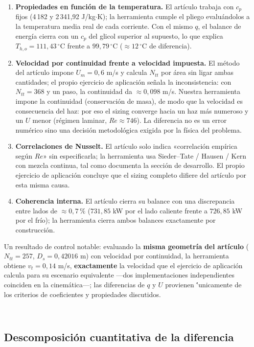 \documentclass[11pt,a4paper]{article}
\begin{document}
\begin{enumerate}
\item \textbf{Propiedades en funci\'on de la temperatura.} El art\'iculo
trabaja con $c_p$ fijos (4\,182 y 2\,341,92 J/kg$\cdot$K); la herramienta
cumple el pliego evalu\'andolos a la temperatura media real de cada corriente.
Con el mismo $q$, el balance de energ\'ia cierra con un $c_p$ del glicol
superior al supuesto, lo que explica $T_{h,o} = 111{,}43\,^\circ$C frente a
$99{,}79\,^\circ$C ($\approx 12\,^\circ$C de diferencia).
\item \textbf{Velocidad por continuidad frente a velocidad impuesta.} El
m\'etodo del art\'iculo impone $U_m = 0{,}6$ m/s y calcula $N_{tt}$ por
\'area sin ligar ambas cantidades; el propio ejercicio de aplicaci\'on se\~nala
la inconsistencia: con $N_{tt} = 368$ y un paso, la continuidad da
$\approx 0{,}098$ m/s. Nuestra herramienta impone la continuidad
(conservaci\'on de masa), de modo que la velocidad es consecuencia del haz:
por eso el sizing converge hacia un haz m\'as numeroso y un $U$ menor
(r\'egimen laminar, $Re \approx 746$). La diferencia no es un error num\'erico
sino una decisi\'on metodol\'ogica exigida por la f\'isica del problema.
\item \textbf{Correlaciones de Nusselt.} El art\'iculo solo indica
«correlaci\'on emp\'irica seg\'un $Re$» sin especificarla; la herramienta usa
Sieder--Tate / Hausen / Kern con mezcla continua, tal como documenta la
secci\'on de desarrollo. El propio ejercicio de aplicaci\'on concluye que el
sizing completo difiere del art\'iculo por esta misma causa.
\item \textbf{Coherencia interna.} El art\'iculo cierra su balance con una
discrepancia entre lados de $\approx 0{,}7\,\%$ ($731{,}85$ kW por el lado
caliente frente a $726{,}85$ kW por el fr\'io); la herramienta cierra ambos
balances exactamente por construcci\'on.
\end{enumerate}

Un resultado de control notable: evaluando la \textbf{misma geometr\'ia del
art\'iculo} ($N_{tt} = 257$, $D_s = 0{,}42016$ m) con velocidad por
continuidad, la herramienta obtiene $v_t = 0{,}14$ m/s, \textbf{exactamente}
la velocidad que el ejercicio de aplicaci\'on calcula para su escenario
equivalente ---dos implementaciones independientes coinciden en la
cinem\'atica---; las diferencias de $q$ y $U$ provienen \''unicamente de los
criterios de coeficientes y propiedades discutidos.

\


\subsection{Descomposici\'on cuantitativa de la diferencia}
\label{sec:tan-descomposicion}
\end{document}
